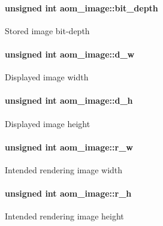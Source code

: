 \paragraph[{\texorpdfstring{bit\+\_\+depth}{bit_depth}}]{\setlength{\rightskip}{0pt plus 5cm}unsigned int aom\+\_\+image\+::bit\+\_\+depth}\hypertarget{structaom__image_a46ed9ffd741938d306a0db5a24bdcf8e}{}\label{structaom__image_a46ed9ffd741938d306a0db5a24bdcf8e}
Stored image bit-\/depth 
\paragraph[{\texorpdfstring{d\+\_\+w}{d_w}}]{\setlength{\rightskip}{0pt plus 5cm}unsigned int aom\+\_\+image\+::d\+\_\+w}\hypertarget{structaom__image_a89f80b1f58d608b9d2080635f4359034}{}\label{structaom__image_a89f80b1f58d608b9d2080635f4359034}
Displayed image width 
\paragraph[{\texorpdfstring{d\+\_\+h}{d_h}}]{\setlength{\rightskip}{0pt plus 5cm}unsigned int aom\+\_\+image\+::d\+\_\+h}\hypertarget{structaom__image_ab986419a1f0fff93a2dc505f47194988}{}\label{structaom__image_ab986419a1f0fff93a2dc505f47194988}
Displayed image height 
\paragraph[{\texorpdfstring{r\+\_\+w}{r_w}}]{\setlength{\rightskip}{0pt plus 5cm}unsigned int aom\+\_\+image\+::r\+\_\+w}\hypertarget{structaom__image_aa2365dc74ee71cded1a149e5d48d6c86}{}\label{structaom__image_aa2365dc74ee71cded1a149e5d48d6c86}
Intended rendering image width 
\paragraph[{\texorpdfstring{r\+\_\+h}{r_h}}]{\setlength{\rightskip}{0pt plus 5cm}unsigned int aom\+\_\+image\+::r\+\_\+h}\hypertarget{structaom__image_aa996793ca8bfb0e6da05945898d39367}{}\label{structaom__image_aa996793ca8bfb0e6da05945898d39367}
Intended rendering image height 
